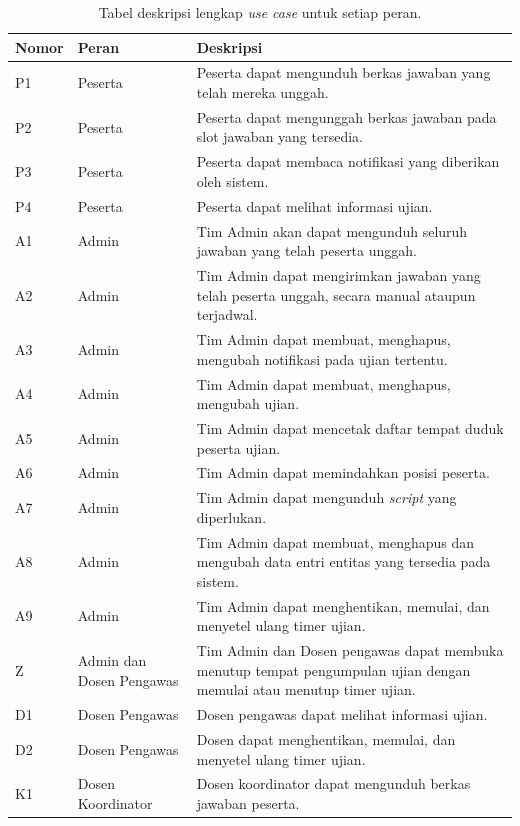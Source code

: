 \begin{table}[ht]
    \centering
    \caption{Tabel deskripsi lengkap \textit{use case} untuk setiap peran.}
    \label{tab:usecase_desc}
    \begin{tabularx}{\textwidth}{|p{1.2cm}|p{2cm}|X|}
         \hline
         Nomor & Peran & Deskripsi  \\
         \hline
         P1 & Peserta & Peserta dapat mengunduh berkas jawaban yang telah mereka unggah. \\
         \hline
         P2 & Peserta & Peserta dapat mengunggah berkas jawaban pada slot jawaban yang tersedia. \\
         \hline
         P3 & Peserta & Peserta dapat membaca notifikasi yang diberikan oleh sistem. \\
         \hline
         P4 & Peserta & Peserta dapat melihat informasi ujian. \\
         \hline
         A1 & Admin & Tim Admin akan dapat mengunduh seluruh jawaban yang telah peserta unggah. \\
         \hline
         A2 & Admin & Tim Admin dapat mengirimkan jawaban yang telah peserta unggah, secara manual ataupun terjadwal. \\
         \hline
         A3 & Admin & Tim Admin dapat membuat, menghapus, mengubah notifikasi pada ujian tertentu. \\
         \hline
         A4 & Admin & Tim Admin dapat membuat, menghapus, mengubah ujian. \\
         \hline
         A5 & Admin & Tim Admin dapat mencetak daftar tempat duduk peserta ujian. \\
         \hline
         A6 & Admin & Tim Admin dapat memindahkan posisi peserta. \\
         \hline
         A7 & Admin & Tim Admin dapat mengunduh \textit{script} yang diperlukan. \\
         \hline
         A8 & Admin & Tim Admin dapat membuat, menghapus dan mengubah data entri entitas yang tersedia pada sistem. \\
         \hline
         A9 & Admin & Tim Admin dapat menghentikan, memulai, dan menyetel ulang timer ujian. \\
         \hline
         Z & Admin dan Dosen Pengawas & Tim Admin dan Dosen pengawas dapat membuka menutup tempat pengumpulan ujian dengan
         memulai atau menutup timer ujian. \\
         \hline
         D1 & Dosen Pengawas & Dosen pengawas dapat melihat informasi ujian. \\
         \hline
         D2 & Dosen Pengawas & Dosen dapat menghentikan, memulai, dan menyetel ulang timer ujian. \\
         \hline
         K1 & Dosen Koordinator & Dosen koordinator dapat mengunduh berkas jawaban peserta. \\
         \hline
    \end{tabularx}
\end{table}
